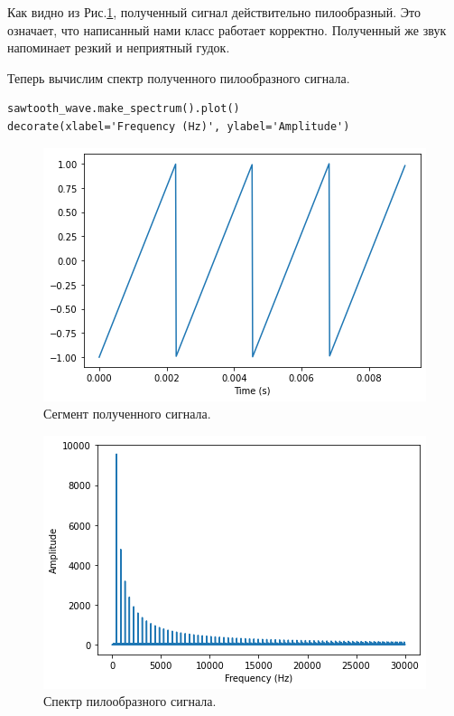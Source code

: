 \documentclass[a4paper, 14pt]{extarticle}
\begin{document}
    Как видно из Рис.\ref{fig:task2_segment_signal}, полученный сигнал действительно пилообразный.
    Это означает, что написанный нами класс работает корректно. Полученный же звук напоминает резкий и неприятный гудок.

    Теперь вычислим спектр полученного пилообразного сигнала.

    \begin{lstlisting}[caption= Вычисление и вывод спектра пилообразного сигнала., label={lst:task2_spectrum_sawtooth}]
sawtooth_wave.make_spectrum().plot()
decorate(xlabel='Frequency (Hz)', ylabel='Amplitude')
    \end{lstlisting}

    \begin{figure}[H]
        \centering
        \includegraphics[width=0.8\linewidth]{resources/Images/task2_segment_signal}
        \caption{Сегмент полученного сигнала.}
        \label{fig:task2_segment_signal}
    \end{figure}

    \begin{figure}[H]
        \centering
        \includegraphics[width=0.8\linewidth]{resources/Images/task2_spectrum_sawtooth}
        \caption{Спектр пилообразного сигнала.}
        \label{fig:task2_spectrum_sawtooth}
    \end{figure}
\end{document}
